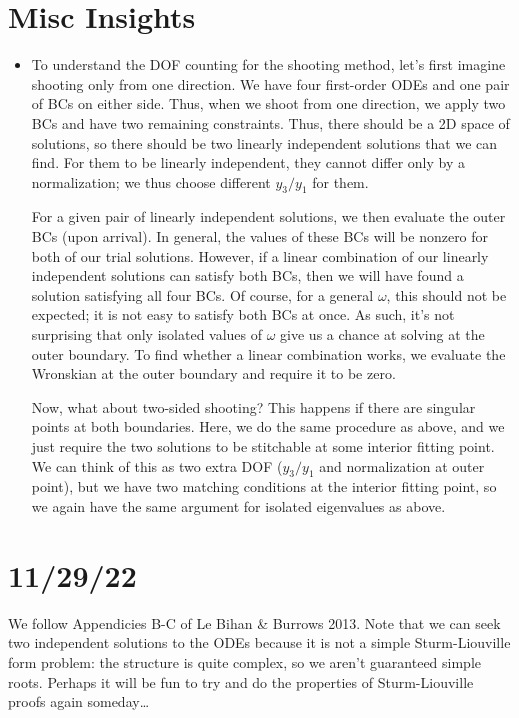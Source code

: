 \documentclass[11pt,
        usenames, %
        twocolumn,
        landscape,
        dvipsnames %
    ]{article}
\begin{document}
\section{Misc Insights}

\begin{itemize}
    \item To understand the DOF counting for the shooting method, let's first
        imagine shooting only from one direction. We have four first-order ODEs
        and one pair of BCs on either side. Thus, when we shoot from one
        direction, we apply two BCs and have two remaining constraints. Thus,
        there should be a 2D space of solutions, so there should be two
        linearly independent solutions that we can find. For them to be linearly
        independent, they cannot differ only by a normalization; we thus choose
        different $y_3 / y_1$ for them.

        For a given pair of linearly independent solutions, we then evaluate the
        outer BCs (upon arrival). In general, the values of these BCs will be
        nonzero for both of our trial solutions. However, if a linear
        combination of our linearly independent solutions can satisfy both BCs,
        then we will have found a solution satisfying all four BCs. Of course,
        for a general $\omega$, this should not be expected; it is not easy to
        satisfy both BCs at once. As such, it's not surprising that only
        isolated values of $\omega$ give us a chance at solving at the outer
        boundary. To find whether a linear combination works, we evaluate the
        Wronskian at the outer boundary and require it to be zero.

        Now, what about two-sided shooting? This happens if there are
        singular points at both boundaries. Here, we do the same procedure as
        above, and we just require the two solutions to be stitchable at some
        interior fitting point. We can think of this as two extra DOF ($y_3 /
        y_1$ and normalization at outer point), but we have two matching
        conditions at the interior fitting point, so we again have the same
        argument for isolated eigenvalues as above.
\end{itemize}

\section{11/29/22}

We follow Appendicies B-C of Le Bihan \& Burrows 2013. Note that we can seek two
independent solutions to the ODEs because it is not a simple Sturm-Liouville
form problem: the structure is quite complex, so we aren't guaranteed simple
roots. Perhaps it will be fun to try and do the properties of Sturm-Liouville
proofs again someday\dots
\end{document}
